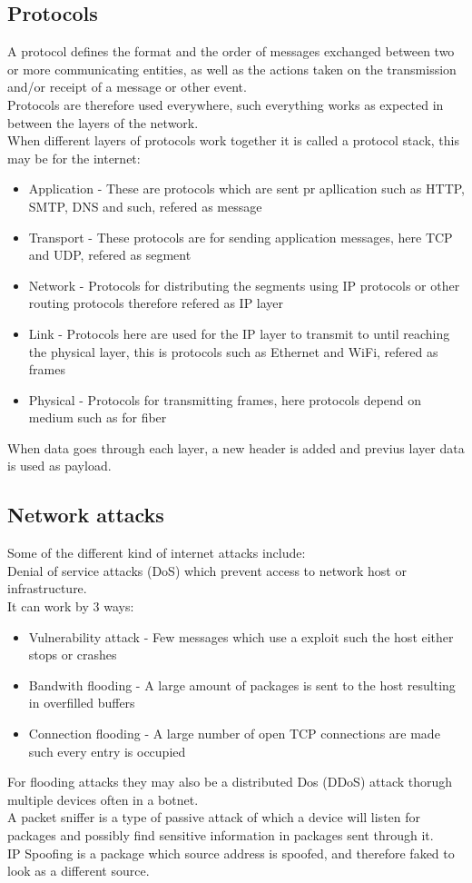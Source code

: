 \documentclass[12pt, a4paper]{article}
\begin{document}
		\subsection{Protocols}
			A protocol defines the format and the order of messages exchanged between two or more communicating entities, as well as the actions taken on the transmission and/or receipt of a message or other event.\\[4mm]
			Protocols are therefore used everywhere, such everything works as expected in between the layers of the network.\\
			When different layers of protocols work together it is called a protocol stack, this may be for the internet: 
			\begin{itemize}
				\item Application - These are protocols which are sent pr apllication such as HTTP, SMTP, DNS and such, refered as message
				\item Transport - These protocols are for sending application messages, here TCP and UDP, refered as segment
				\item Network - Protocols for distributing the segments using IP protocols or other routing protocols therefore refered as IP layer
				\item Link - Protocols here are used for the IP layer to transmit to until reaching the physical layer, this is protocols such as Ethernet and WiFi, refered as frames
				\item Physical - Protocols for transmitting frames, here protocols depend on medium such as for fiber
			\end{itemize}
			When data goes through each layer, a new header is added and previus layer data is used as payload.\\
		\subsection{Network attacks}
			Some of the different kind of internet attacks include:\\
			Denial of service attacks (DoS) which prevent access to network host or infrastructure.\\
			It can work by 3 ways:
			\begin{itemize}
				\item Vulnerability attack - Few messages which use a exploit such the host either stops or crashes
				\item Bandwith flooding - A large amount of packages is sent to the host resulting in overfilled buffers
				\item Connection flooding - A large number of open TCP connections are made such every entry is occupied
			\end{itemize}
			For flooding attacks they may also be a distributed Dos  (DDoS) attack thorugh multiple devices often in a botnet.\\[4mm]
			A packet sniffer is a type of passive attack of which a device will listen for packages and possibly find sensitive information in packages sent through it.\\
			IP Spoofing is a package which source address is spoofed, and therefore faked to look as a different source.\\
			
				
		
			
			
			
\end{document}

